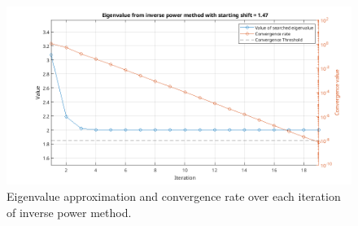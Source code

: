 \begin{figure}[H]
    \centering
    \includegraphics[width=1\textwidth]{problems/Figures/Problem2InversePowerMethod.png}
    \caption{Eigenvalue approximation and convergence rate over each iteration of inverse power method.}
    \label{fig:Inverse}
\end{figure}

